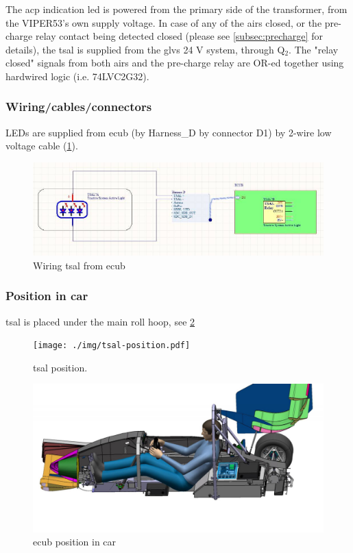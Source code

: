 The \gls{acp} indication led is powered from the primary side of the transformer, from the VIPER53's own supply voltage.
In case of any of the \glspl{air} closed, or the pre-charge relay contact being detected closed (please see \ref{subsec:precharge}  for details), the \gls{tsal} is supplied from the \gls{glvs} 24 V system, through Q$_2$. The "relay closed" signals from both \glspl{air} and the pre-charge relay are OR-ed together using hardwired logic (i.e. 74LVC2G32).

\subsubsection{Wiring/cables/connectors}

LEDs are supplied from \gls{ecub} (by Harness\_D by connector D1) by 2-wire low voltage cable (\ref{fig:TSAL-wiring}).

\begin{figure}[H]
	\centering
	\includegraphics[width=\textwidth,]{./img/tsal-wiring.jpg}
	\caption{Wiring \gls{tsal} from \gls{ecub}}
	\label{fig:TSAL-wiring}
\end{figure}

\subsubsection{Position in car}
\gls{tsal} is placed under the main roll hoop, see \ref{fig:TSAL-position}

\begin{figure}[H]
	\centering
	\texttt{[image: ./img/tsal-position.pdf]}
	\caption{\Gls{tsal} position.}
	\label{fig:TSAL-position}
\end{figure}

\begin{figure}[H]
	\centering
	\includegraphics[width=\textwidth]{./img/ECUB_POSITION.jpg}
	\caption{\gls{ecub} position in car}
	\label{fig:ecub_position}
\end{figure}
